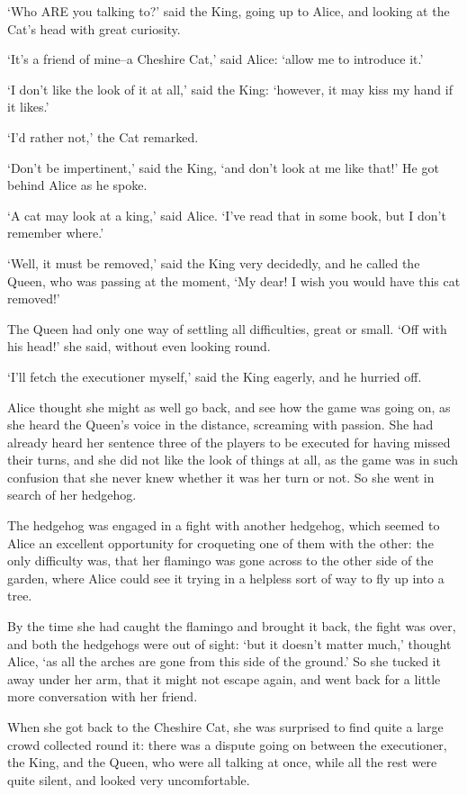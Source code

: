 \documentclass[12pt]{book}
\begin{document}
  `Who ARE you talking to?' said the King, going up to Alice, and
looking at the Cat's head with great curiosity.

  `It's a friend of mine--a Cheshire Cat,' said Alice:  `allow me
to introduce it.'

  `I don't like the look of it at all,' said the King:
`however, it may kiss my hand if it likes.'

  `I'd rather not,' the Cat remarked.

  `Don't be impertinent,' said the King, `and don't look at me
like that!'  He got behind Alice as he spoke.

  `A cat may look at a king,' said Alice.  `I've read that in
some book, but I don't remember where.'

  `Well, it must be removed,' said the King very decidedly, and
he called the Queen, who was passing at the moment, `My dear!  I
wish you would have this cat removed!'

  The Queen had only one way of settling all difficulties, great
or small.  `Off with his head!' she said, without even looking
round.

  `I'll fetch the executioner myself,' said the King eagerly, and
he hurried off.

  Alice thought she might as well go back, and see how the game
was going on, as she heard the Queen's voice in the distance,
screaming with passion.  She had already heard her sentence three
of the players to be executed for having missed their turns, and
she did not like the look of things at all, as the game was in
such confusion that she never knew whether it was her turn or
not.  So she went in search of her hedgehog.

  The hedgehog was engaged in a fight with another hedgehog,
which seemed to Alice an excellent opportunity for croqueting one
of them with the other:  the only difficulty was, that her
flamingo was gone across to the other side of the garden, where
Alice could see it trying in a helpless sort of way to fly up
into a tree.

  By the time she had caught the flamingo and brought it back,
the fight was over, and both the hedgehogs were out of sight:
`but it doesn't matter much,' thought Alice, `as all the arches
are gone from this side of the ground.'  So she tucked it away
under her arm, that it might not escape again, and went back for
a little more conversation with her friend.

  When she got back to the Cheshire Cat, she was surprised to
find quite a large crowd collected round it:  there was a dispute
going on between the executioner, the King, and the Queen, who
were all talking at once, while all the rest were quite silent,
and looked very uncomfortable.
\end{document}
